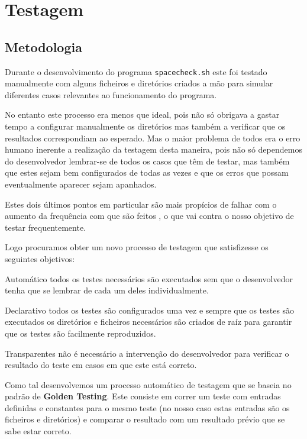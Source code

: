 \chapter{Testagem}

\section{Metodologia}\label{sec:testing_metodology}

Durante o desenvolvimento do programa \Verb|spacecheck.sh| este foi testado
manualmente com alguns ficheiros e diretórios criados a mão para simular
diferentes casos relevantes ao funcionamento do programa.

No entanto este processo era menos que ideal, pois não só obrigava a gastar
tempo a configurar manualmente os diretórios mas também a verificar que os
resultados correspondiam ao esperado. Mas o maior problema de todos era o erro
humano inerente a realização da testagem desta maneira, pois não só dependemos
do desenvolvedor lembrar-se de todos os casos que têm de testar, mas também que
estes sejam bem configurados de todas as vezes e que os erros que possam
eventualmente aparecer sejam apanhados.

Estes dois últimos pontos em particular são mais propícios de falhar com o
aumento da frequência com que são feitos \cite{fewster1999software, rafi2012benefits},
o que vai contra o nosso objetivo de testar frequentemente.

Logo procuramos obter um novo processo de testagem que satisfizesse os seguintes
objetivos:

\begin{enumdescript}
	\item[Automático]
	todos os testes necessários são executados sem que o desenvolvedor tenha que
	se lembrar de cada um deles individualmente.
	\item[Declarativo]
	todos os testes são configurados uma vez e sempre que os testes são
	executados os diretórios e ficheiros necessários são criados de raíz
	para garantir que os testes são facilmente reproduzidos.
	\item[Transparentes]
	não é necessário a intervenção do desenvolvedor para verificar o resultado
	do teste em casos em que este está correto.
\end{enumdescript}

Como tal desenvolvemos um processo automático de testagem que se baseia no
padrão de \textbf{Golden Testing}\cite{goldenTestsAreTasty}.
Este consiste em correr um teste com entradas
definidas e constantes para o mesmo teste (no nosso caso estas entradas são os
ficheiros e diretórios) e comparar o resultado com um resultado prévio que se
sabe estar correto.

